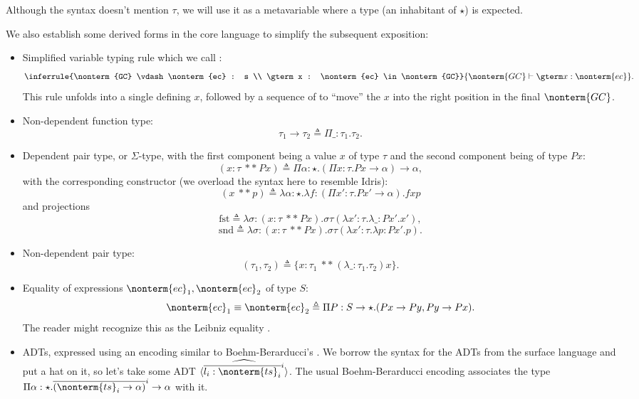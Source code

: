 \documentclass[a4paper]{article}
\begin{document}
Although the syntax doesn't mention $\tau$, we will use it as a metavariable
where a type (an inhabitant of $\star$) is expected.

\newcommand{\dast}{\ **\ }

We also establish some derived forms in the core language to simplify the subsequent exposition:

\begin{itemize}
  \item Simplified variable typing rule which we call :
    \[
      \inferrule{\nonterm{GC} \vdash \nonterm{ec} : s \\ \gterm x : \nonterm{ec} \in \nonterm{GC}}
                {\nonterm{GC} \vdash \gterm x : \nonterm{ec}}.
    \]
    This rule unfolds into a single  defining $x$,
    followed by a sequence of 
    to ``move'' the $x$ into the right position in the final $\nonterm{GC}$.
  \item Non-dependent function type:
    \[
      \tau_1 \rightarrow \tau_2 \triangleq \Pi \_ : \tau_1. \tau_2.
    \]
  \item Dependent pair type, or $\Sigma$-type, with the first component being a value $x$ of type $\tau$ and the second component being of type $P x$:
    \[
      (x : \tau \dast P x) \triangleq \Pi \alpha : \star. (\Pi x : \tau. P x \rightarrow \alpha) \rightarrow \alpha,
    \]
    with the corresponding constructor (we overload the syntax here to resemble Idris):
    \[
      (x \dast p) \triangleq \lambda \alpha : \star. \lambda f : (\Pi x' : \tau. P x' \rightarrow \alpha). f x p
    \]
    and projections
    \[
      \text{fst} \triangleq \lambda \sigma : (x : \tau \dast P x). \sigma \tau (\lambda x' : \tau. \lambda \_ : P x'. x'),
    \]
    \[
      \text{snd} \triangleq \lambda \sigma : (x : \tau \dast P x). \sigma \tau (\lambda x' : \tau. \lambda p : P x'. p).
    \]
  \item Non-dependent pair type:
    \[
      (\tau_1, \tau_2) \triangleq \{ x : \tau_1\ **\ (\lambda \_ : \tau_1. \tau_2) x \}.
    \]
  \item Equality of expressions $\nonterm{ec}_1, \nonterm{ec}_2$ of type $S$:
    \[
      \nonterm{ec}_1 \equiv \nonterm{ec}_2 \triangleq \Pi P : S \rightarrow \star. (P x \rightarrow P y, P y \rightarrow P x).
    \]
    The reader might recognize this as the Leibniz equality \cite{FindSomethingForThis}.
  \item ADTs, expressed using an encoding similar to Boehm-Berarducci's \cite{Bohm85}.
    We borrow the syntax for the ADTs from the surface language and put a hat on it,
    so let's take some ADT $\widehat{\langle \overline{l_i : \nonterm{ts}_i}^i \rangle}$.
    The usual Boehm-Berarducci encoding associates the type
    $\Pi \alpha : \star. \overline{(\nonterm{ts}_i \rightarrow \alpha)}^i \rightarrow \alpha$ with it.


\end{itemize}
\end{document}
